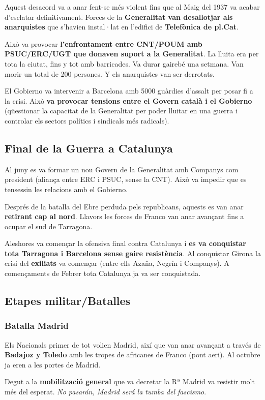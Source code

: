 \documentclass[arial,a4paper,print]{article}
\begin{document}
Aquest desacord va a anar fent-se més violent fins que al Maig del 1937 va acabar d'esclatar definitivament. Forces de la \textbf{Generalitat van desallotjar als anarquistes} que s'havien instal·lat en l'edifici de \textbf{Telefònica de pl.Cat}. 

Això va provocar \textbf{l'enfrontament entre CNT/POUM amb PSUC/ERC/UGT que donaven suport a la Generalitat}. La lluita era per tota la ciutat, fins y tot amb barricades. Va durar gairebé una setmana. Van morir un total de 200 persones. Y els anarquistes van ser derrotats. 

El Gobierno va intervenir a Barcelona amb 5000 guàrdies d'assalt per posar fi a la crisi. Això \textbf{va provocar tensions entre el Govern català i el Gobierno} (qüestionar la capacitat de la Generalitat per poder lluitar en una guerra i controlar els sectors polítics i sindicals més radicals). 

\subsection{Final de la Guerra a Catalunya}
Al juny es va formar un nou Govern de la Generalitat amb Companys com president (aliança entre ERC i PSUC, sense la CNT). Això va impedir que es tensessin les relacions amb el Gobierno. 

Després de la batalla del Ebre perduda pels republicans, aquests es van anar \textbf{retirant cap al nord}. Llavors les forces de Franco van anar avançant fins a ocupar el sud de Tarragona.  

Aleshores va començar la ofensiva final contra Catalunya i \textbf{es va conquistar tota Tarragona i Barcelona sense gaire resistència}. Al conquistar Girona la crisi del \textbf{exiliats} va començar (entre ells Azaña, Negrín i Companys). A començaments de Febrer tota Catalunya ja va ser conquistada. 

\subsection{Etapes militar/Batalles}
\subsubsection{Batalla Madrid}
Els Nacionals primer de tot volien Madrid, així que van anar avançant a través de \textbf{Badajoz y Toledo} amb les tropes de africanes de Franco (pont aeri). Al octubre ja eren a les portes de Madrid. 

Degut a la \textbf{mobilització general} que va decretar la Rª Madrid va resistir molt més del esperat. \textit{No pasarán, Madrid será la tumba del fascismo}. 
\end{document}
